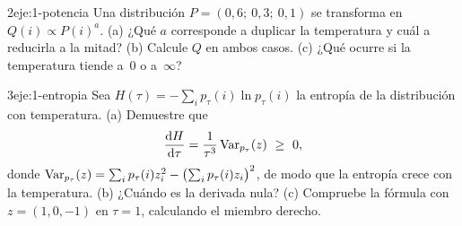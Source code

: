 \begin{ejercicio}{2}{eje:1-potencia}
Una distribución $P=(0{,}6;\allowbreak\ 0{,}3;\allowbreak\ 0{,}1)$ se transforma en $Q(i)\propto P(i)^{a}$. (a) ¿Qué $a$ corresponde a duplicar la temperatura y cuál a reducirla a la mitad? (b) Calcule $Q$ en ambos casos. (c) ¿Qué ocurre si la temperatura tiende a~0 o a~$\infty$?
\end{ejercicio}

\begin{ejercicio}{3}{eje:1-entropia}
Sea $H(\tau)=-\sum_i p_\tau(i)\ln p_\tau(i)$ la entropía de la distribución con temperatura. (a) Demuestre que
\[
\frac{\mathrm{d}H}{\mathrm{d}\tau}=\frac{1}{\tau^{3}}\Var_{p_\tau}(z)\ \ge\ 0,
\]
donde $\operatorname{Var}_{p_\tau}(z)=\sum_i p_\tau(i)z_i^{2}-\bigl(\sum_i p_\tau(i)z_i\bigr)^{2}$, de modo que la entropía crece con la temperatura. (b) ¿Cuándo es la derivada nula? (c) Compruebe la fórmula con $z=(1,0,-1)$ en $\tau=1$, calculando el miembro derecho.
\end{ejercicio}
